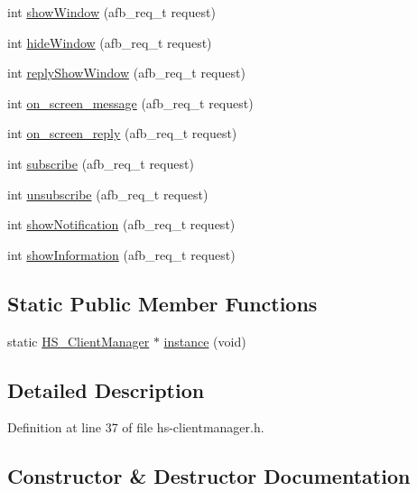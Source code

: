\begin{DoxyCompactItemize}
int \hyperlink{class_h_s___client_manager_afed8158f276d1d22c32b0d89e970d442}{show\+Window} (afb\+\_\+req\+\_\+t request)
\item 
int \hyperlink{class_h_s___client_manager_a6195694d281a3b97b0345b96c0add1fd}{hide\+Window} (afb\+\_\+req\+\_\+t request)
\item 
int \hyperlink{class_h_s___client_manager_a59b1c1e115b5a257a585c41f854f5fdd}{reply\+Show\+Window} (afb\+\_\+req\+\_\+t request)
\item 
int \hyperlink{class_h_s___client_manager_a58ce4a013d3694265dd69f481bf88510}{on\+\_\+screen\+\_\+message} (afb\+\_\+req\+\_\+t request)
\item 
int \hyperlink{class_h_s___client_manager_aa78f992287e3b8fe93422b331dc9edc5}{on\+\_\+screen\+\_\+reply} (afb\+\_\+req\+\_\+t request)
\item 
int \hyperlink{class_h_s___client_manager_a1b8a4e42342c4bcdc4e7dc4934e02469}{subscribe} (afb\+\_\+req\+\_\+t request)
\item 
int \hyperlink{class_h_s___client_manager_ac86314afbb90116e2f02ce071166226e}{unsubscribe} (afb\+\_\+req\+\_\+t request)
\item 
int \hyperlink{class_h_s___client_manager_a857934af280081ca6ac61d9f2cac37c5}{show\+Notification} (afb\+\_\+req\+\_\+t request)
\item 
int \hyperlink{class_h_s___client_manager_a0645294f89c67fd3c9b0cce62a900f69}{show\+Information} (afb\+\_\+req\+\_\+t request)
\end{DoxyCompactItemize}
\subsection*{Static Public Member Functions}
\begin{DoxyCompactItemize}
\item 
static \hyperlink{class_h_s___client_manager}{H\+S\+\_\+\+Client\+Manager} $\ast$ \hyperlink{class_h_s___client_manager_ad86c1fea7d107d52cbf0466fb7a2658b}{instance} (void)
\end{DoxyCompactItemize}


\subsection{Detailed Description}


Definition at line 37 of file hs-\/clientmanager.\+h.



\subsection{Constructor \& Destructor Documentation}
